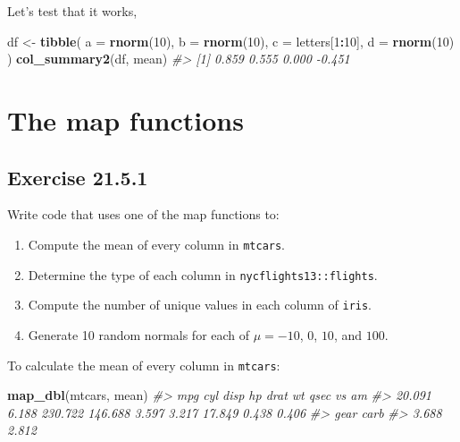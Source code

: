 \documentclass[]{book}
\newenvironment{Shaded}{\begin{snugshade}}{\end{snugshade}}
\newcommand{\CommentTok}[1]{\textcolor[rgb]{0.56,0.35,0.01}{\textit{#1}}}
\newcommand{\DataTypeTok}[1]{\textcolor[rgb]{0.13,0.29,0.53}{#1}}
\newcommand{\DecValTok}[1]{\textcolor[rgb]{0.00,0.00,0.81}{#1}}
\newcommand{\KeywordTok}[1]{\textcolor[rgb]{0.13,0.29,0.53}{\textbf{#1}}}
\newcommand{\NormalTok}[1]{#1}
\newcommand{\OperatorTok}[1]{\textcolor[rgb]{0.81,0.36,0.00}{\textbf{#1}}}
\newcommand{\StringTok}[1]{\textcolor[rgb]{0.31,0.60,0.02}{#1}}
\providecommand{\tightlist}{%
  \setlength{\itemsep}{0pt}\setlength{\parskip}{0pt}}
\theoremstyle{plain}
\theoremstyle{remark}
\begin{document}
Let's test that it works,

\begin{Shaded}
\begin{Highlighting}[]
\NormalTok{df <-}\StringTok{ }\KeywordTok{tibble}\NormalTok{(}
  \DataTypeTok{a =} \KeywordTok{rnorm}\NormalTok{(}\DecValTok{10}\NormalTok{),}
  \DataTypeTok{b =} \KeywordTok{rnorm}\NormalTok{(}\DecValTok{10}\NormalTok{),}
  \DataTypeTok{c =}\NormalTok{ letters[}\DecValTok{1}\OperatorTok{:}\DecValTok{10}\NormalTok{],}
  \DataTypeTok{d =} \KeywordTok{rnorm}\NormalTok{(}\DecValTok{10}\NormalTok{)}
\NormalTok{)}
\KeywordTok{col_summary2}\NormalTok{(df, mean)}
\CommentTok{#> [1]  0.859  0.555  0.000 -0.451}
\end{Highlighting}
\end{Shaded}

\hypertarget{the-map-functions}{%
\section{The map functions}\label{the-map-functions}}

\hypertarget{exercise-21.5.1}{%
\subsection*{\texorpdfstring{Exercise
{21.5.1}}{Exercise 21.5.1}}\label{exercise-21.5.1}}

Write code that uses one of the map functions to:

\begin{enumerate}
\def\labelenumi{\arabic{enumi}.}
\tightlist
\item
  Compute the mean of every column in \texttt{mtcars}.
\item
  Determine the type of each column in \texttt{nycflights13::flights}.
\item
  Compute the number of unique values in each column of \texttt{iris}.
\item
  Generate 10 random normals for each of \(\mu = -10\), \(0\), \(10\),
  and \(100\).
\end{enumerate}

To calculate the mean of every column in \texttt{mtcars}:

\begin{Shaded}
\begin{Highlighting}[]
\KeywordTok{map_dbl}\NormalTok{(mtcars, mean)}
\CommentTok{#>     mpg     cyl    disp      hp    drat      wt    qsec      vs      am }
\CommentTok{#>  20.091   6.188 230.722 146.688   3.597   3.217  17.849   0.438   0.406 }
\CommentTok{#>    gear    carb }
\CommentTok{#>   3.688   2.812}
\end{Highlighting}
\end{Shaded}
\end{document}
